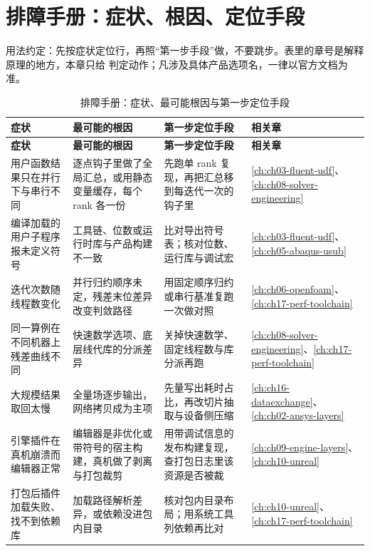 \documentclass[12pt,a4paper,fontset=fandol]{ctexbook}
\begin{document}
\section{排障手册：症状、根因、定位手段}
\label{sec:ch18-troubleshoot}

用法约定：先按症状定位行，再照``第一步手段''做，不要跳步。表里的章号是解释原理的地方，本章只给
判定动作；凡涉及具体产品选项名，一律以官方文档为准。

\begingroup\small
\begin{longtable}{>{\raggedright\arraybackslash}p{}
                 >{\raggedright\arraybackslash}p{}
                 >{\raggedright\arraybackslash}p{}
                 >{\raggedright\arraybackslash}p{}}
\caption{排障手册：症状、最可能根因与第一步定位手段}\label{tab:ch18-troubleshoot}\\
\toprule
\textbf{症状} & \textbf{最可能的根因} & \textbf{第一步定位手段} & \textbf{相关章} \\
\midrule
\endfirsthead
\toprule
\textbf{症状} & \textbf{最可能的根因} & \textbf{第一步定位手段} & \textbf{相关章} \\
\midrule
\endhead
\midrule
\endfoot
\bottomrule
\endlastfoot
用户函数结果只在并行下与串行不同 & 逐点钩子里做了全局汇总，或用静态变量缓存，每个 rank 各一份 & 先跑单 rank 复现，再把汇总移到每迭代一次的钩子里 & \ref{ch:ch03-fluent-udf}、\ref{ch:ch08-solver-engineering} \\
编译加载的用户子程序报未定义符号 & 工具链、位数或运行时库与产品构建不一致 & 比对导出符号表；核对位数、运行库与调试宏 & \ref{ch:ch03-fluent-udf}、\ref{ch:ch05-abaqus-usub} \\
迭代次数随线程数变化 & 并行归约顺序未定，残差末位差异改变判敛路径 & 用固定顺序归约或串行基准复跑一次做对照 & \ref{ch:ch06-openfoam}、\ref{ch:ch17-perf-toolchain} \\
同一算例在不同机器上残差曲线不同 & 快速数学选项、底层线代库的分派差异 & 关掉快速数学、固定线程数与库分派再跑 & \ref{ch:ch08-solver-engineering}、\ref{ch:ch17-perf-toolchain} \\
大规模结果取回太慢 & 全量场逐步输出，网络拷贝成为主项 & 先量写出耗时占比，再改切片抽取与设备侧压缩 & \ref{ch:ch16-dataexchange}、\ref{ch:ch02-ansys-layers} \\
引擎插件在真机崩溃而编辑器正常 & 编辑器是非优化或带符号的宿主构建，真机做了剥离与打包裁剪 & 用带调试信息的发布构建复现，查打包日志里该资源是否被裁 & \ref{ch:ch09-engine-layers}、\ref{ch:ch10-unreal} \\
打包后插件加载失败、找不到依赖库 & 加载路径解析差异，或依赖没进包内目录 & 核对包内目录布局；用系统工具列依赖再比对 & \ref{ch:ch10-unreal}、\ref{ch:ch17-perf-toolchain} \\

\end{longtable}
\end{document}

